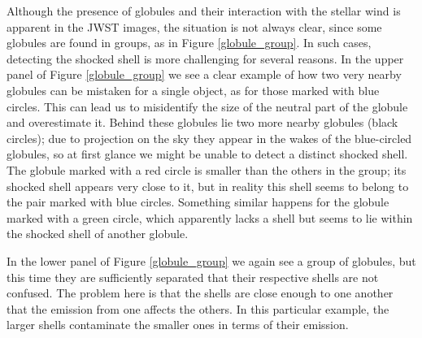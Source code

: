 \documentclass{book}
\begin{document}
Although the presence of globules and their interaction with the
stellar wind is apparent in the JWST images, the situation is not
always clear, since some globules are found in groups, as in Figure
\ref{globule_group}. In such cases, detecting the shocked shell is
more challenging for several reasons. In the upper panel of Figure
\ref{globule_group} we see a clear example of how two very nearby
globules can be mistaken for a single object, as for those marked with
blue circles. This can lead us to misidentify the size of the neutral
part of the globule and overestimate it. Behind these globules lie two
more nearby globules (black circles); due to projection on the sky
they appear in the wakes of the blue-circled globules, so at first
glance we might be unable to detect a distinct shocked shell. The
globule marked with a red circle is smaller than the others in the
group; its shocked shell appears very close to it, but in reality this
shell seems to belong to the pair marked with blue circles. Something
similar happens for the globule marked with a green circle, which
apparently lacks a shell but seems to lie within the shocked shell of
another globule.

In the lower panel of Figure \ref{globule_group} we again see a group
of globules, but this time they are sufficiently separated that their
respective shells are not confused. The problem here is that the
shells are close enough to one another that the emission from one
affects the others. In this particular example, the larger shells
contaminate the smaller ones in terms of their emission.
\end{document}
